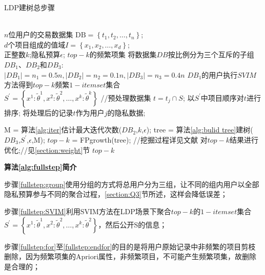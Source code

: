 \documentclass[UTF8,a4paper]{ctexart}
\begin{document}
\begin{algorithm}[htbp]
    \caption{LDP建树总步骤}
    \label{alg:fullstep}
        \begin{algorithmic}[1]
        \REQUIRE ~~\\
        $n$位用户的交易数据集 $\mathrm{DB}=\left\{t_{1}, t_{2}, \ldots, t_{n}\right\}$;\\
        $d$个项目组成的值域$I=\left\{x_{1}, x_{2}, \ldots, x_{d}\right\}$;\\
        正整数$k$;隐私预算$\epsilon$;
        \ENSURE $top-k$的频繁项集
        \STATE 将数据集$DB$按比例分为三个互斥的子组$D B_{1}$、$D B_{2}$和$D B_{3}$: \\
            $\left|D B_{1}\right|=n_{1}=0.5 n,\left|D B_{2}\right|=n_{2}=0.1 n,\left|D B_{3}\right|=n_{3}=0.4 n$
        \label{fullstep:group}
	   \STATE $D B_{1}$的用户执行$SVIM$方法得到$top-k$频繁$1-itemset$集合\\
	       $S^{\prime}=\left\{x^{1}: \tilde{\theta}^{1}, x^{2}: \tilde{\theta}^{2}, \ldots, x^{k}: \tilde{\theta}^{k}\right\}$
        \label{fullstep:SVIM}
        \label{fullstep:for}
        \STATE //预处理数据集
        \STATE $t=t_{j} \cap S$;
        \STATE 以$S^{\prime}$中项目顺序对$t$进行排序;
        \STATE 将处理后的记录$t$作为用户$j$的隐私数据;
        \ENDFOR
        \label{fullstep:endfor}

        \STATE M = 算法\ref{alg:iter}估计最大迭代次数($D B_{2}$,$k$,$\epsilon$);
        \label{fullstep:MaxIter}
        \STATE tree = 算法\ref{alg:bulid tree}建树($D B_{3}$,$S^{\prime}$,$\epsilon$,M);
        \label{fullstep:tree}
        \STATE $top-k$ = FPgrowth(tree); //挖掘过程详见文献
        \label{fullstep:mine}
        \STATE 对$top-k$结果进行优化;//见\ref{section:weight}节
        \label{fullstep:post process}
        \RETURN $top-k$
        \end{algorithmic}
\end{algorithm}

\textbf{算法\ref{alg:fullstep}简介}

步骤\ref{fullstep:group}使用分组的方式将总用户分为三组，让不同的组内用户以全部隐私预算参与不同的聚合过程，\ref{section:Q3}节所述，这样会降低误差；

步骤\ref{fullstep:SVIM}利用SVIM方法在LDP场景下聚合$top-k$的$1-itemset$集合$S^{\prime}=\left\{x^{1}: \tilde{\theta}^{1}, x^{2}: \tilde{\theta}^{2}, \ldots, x^{k}: \tilde{\theta}^{2}\right\}$，然后公开S的信息；

步骤\ref{fullstep:for}至\ref{fullstep:endfor}的目的是将用户原始记录中非频繁的项目剪枝删除，因为频繁项集的Apriori属性，非频繁项目，不可能产生频繁项集，故删除是合理的；
\end{document}
